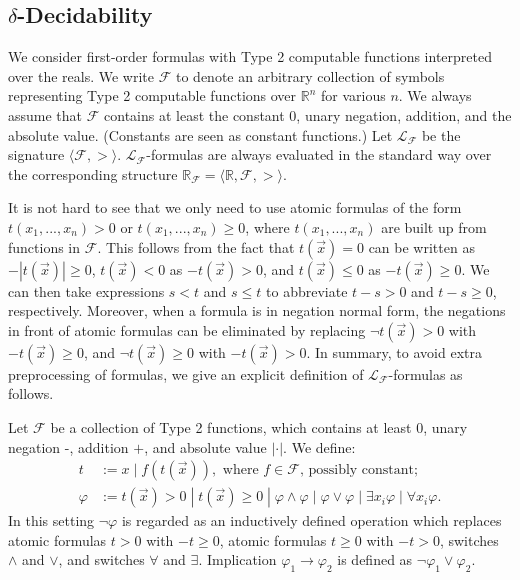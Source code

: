 \documentclass[envcountsect]{llncs}
\begin{document}
\subsection{$\delta$-Decidability}

We consider first-order formulas with Type 2 computable functions interpreted over the reals. We write $\mathcal{F}$ to denote an arbitrary collection of symbols representing Type 2 computable functions over $\mathbb{R}^n$ for various $n$. We always assume that $\mathcal{F}$ contains at least the constant $0$, unary negation, addition, and the absolute value. (Constants are seen as constant functions.) Let $\mathcal{L_{\mathcal{F}}}$ be the signature $\langle \mathcal{F}, >\rangle$. $\mathcal{L}_{\mathcal{F}}$-formulas are always evaluated in the standard way over the corresponding structure $\mathbb{R}_{\mathcal{F}}= \langle \mathbb{R}, \mathcal{F}, >\rangle$.  

It is not hard to see that we only need to use atomic formulas of the form $t(x_1,...,x_n)>0$ or $t(x_1,...,x_n)\geq 0$, where $t(x_1,...,x_n)$ are built up from functions in $\mathcal{F}$. This follows from the fact that $t(\vec x)=0$ can be written as $-|t(\vec x)|\geq 0$, $t(\vec x)<0$ as $-t(\vec x)>0$, and $t(\vec x)\leq 0$ as $-t(\vec x)\geq 0$. We can then take expressions $s <t $ and $s \leq t$ to abbreviate $t - s > 0$ and $t - s \geq 0$, respectively. Moreover, when a formula is in negation normal form, the negations in front of atomic formulas can be eliminated by replacing $\neg t(\vec x) > 0$ with $-t(\vec x)\geq 0$, and $\neg t(\vec x)\geq 0$ with $-t(\vec x)>0$. In summary, to avoid extra preprocessing of formulas, we give an explicit definition of $\mathcal{L}_{\mathcal{F}}$-formulas as follows.

\begin{definition}
Let $\mathcal{F}$ be a collection of Type 2 functions, which contains at least $0$, unary negation -, addition $+$, and absolute value $|\cdot|$. We define:
\begin{align*}
t& := x \; | \; f(t(\vec x)), \mbox{ where }f\in \mathcal{F}\mbox{, possibly constant};\\
\varphi& := t(\vec x)> 0 \; | \; t(\vec x)\geq 0 \; | \; \varphi\wedge\varphi \; | \; \varphi\vee\varphi \; | \; \exists x_i\varphi \; |\; \forall x_i\varphi.
\end{align*}
In this setting $\neg\varphi$ is regarded as an inductively defined operation which replaces atomic formulas $t>0$ with $-t\geq 0$, atomic formulas $t\geq 0$ with $-t>0$, switches $\wedge$ and $\vee$, and switches $\forall$ and $\exists$. Implication $\varphi_1\rightarrow\varphi_2$ is defined as $\neg\varphi_1\vee\varphi_2$.
\end{definition}
\end{document}
